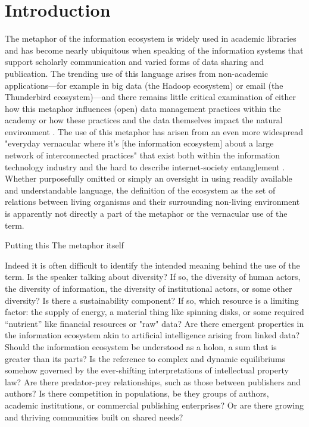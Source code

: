 \section{Introduction}

The metaphor of the information ecosystem is widely used in academic libraries and has become nearly ubiquitous when speaking of the information systems that support scholarly communication and varied forms of data sharing and publication. The trending use of this language arises from non-academic applications—for example in big data (the Hadoop ecosystem) or email (the Thunderbird ecosystem)—and there remains little critical examination of either how this metaphor influences (open) data management practices within the academy or how these practices and the data themselves impact the natural environment \cite[although see][for initial work]{stepp_1999}. The use of this metaphor has arisen from an even more widespread "everyday vernacular where it’s [the information ecosystem] about a large network of interconnected practices" that exist both within the information technology industry and the hard to describe internet-society entanglement \cite{boyd_2016}. Whether purposefully omitted or simply an oversight in using readily available and understandable language, the definition of the ecosystem as the set of relations between living organisms and their surrounding non-living environment is apparently not directly a part of the metaphor or the vernacular use of the term.

Putting this The metaphor itself 

Indeed it is often difficult to identify the intended meaning behind the use of the term. Is the speaker talking about diversity? If so, the diversity of human actors, the diversity of information, the diversity of institutional actors, or some other diversity? Is there a sustainability component? If so, which resource is a limiting factor: the supply of energy, a material thing like spinning disks, or some required “nutrient” like financial resources or "raw" data? Are there emergent properties in the information ecosystem akin to artificial intelligence arising from linked data? Should the information ecosystem be understood as a holon, a sum that is greater than its parts? Is the reference to complex and dynamic equilibriums somehow governed by the ever-shifting interpretations of intellectual property law? Are there predator-prey relationships, such as those between publishers and authors? Is there competition in populations, be they groups of authors, academic institutions, or commercial publishing enterprises? Or are there growing and thriving communities built on shared needs? 


